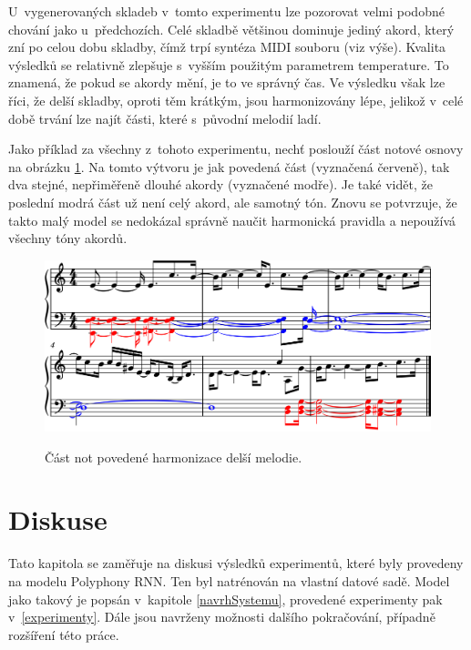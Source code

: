 U~vygenerovaných skladeb v~tomto experimentu lze pozorovat velmi podobné chování
jako u~předchozích.
Celé skladbě většinou dominuje jediný akord, který zní po celou dobu skladby,
čímž trpí syntéza MIDI souboru (viz výše).
Kvalita výsledků se relativně zlepšuje s~vyšším použitým parametrem temperature.
To znamená, že pokud se akordy mění, je to ve správný čas.
Ve výsledku však lze říci, že delší skladby, oproti těm krátkým, 
jsou harmonizovány lépe,
jelikož v~celé době trvání lze najít části, které s~původní melodií ladí.
\par

Jako příklad za všechny z~tohoto experimentu,
nechť poslouží část notové osnovy na obrázku \ref{obrazekMyHarmonyLongPovedenaNoty}.
Na tomto výtvoru je jak povedená část (vyznačená červeně),
tak dva stejné, nepřiměřeně dlouhé akordy (vyznačené modře).
Je také vidět, že poslední modrá část už není celý akord, ale samotný tón.
Znovu se potvrzuje, že takto malý model se nedokázal správně naučit harmonická pravidla
a nepoužívá všechny tóny akordů.

\begin{figure}[h]\centering
    \centering
    \includegraphics[width=0.8\linewidth]{obrazky/MyMelodyLongPovedenaHarmonizaceCastNot-1.png}\\[1pt]  
    \caption{Část not povedené harmonizace delší melodie.}    
    \label{obrazekMyHarmonyLongPovedenaNoty}
\end{figure}



\chapter{Diskuse}
Tato kapitola se zaměřuje na diskusi výsledků experimentů,
které byly provedeny na modelu Polyphony RNN.
Ten byl natrénován na vlastní datové sadě.
Model jako takový je popsán v~kapitole \ref{navrhSystemu},
provedené experimenty pak v~\ref{experimenty}.
Dále jsou navrženy možnosti dalšího pokračování,
případně rozšíření této práce.
\par

